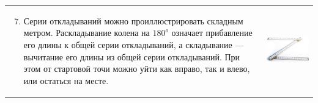 \begin{tabular}{ll}
\begin{minipage}{0.6\linewidth}
\begin{enumerate}\setcounter{enumi}{6}
\item Серии откладываний можно проиллюстрировать складным метром. Раскладывание колена на $180^o$ означает прибавление его длины к общей серии откладываний, а складывание --- вычитание его длины из общей серии откладываний. При этом от стартовой точи можно уйти как вправо, так и влево, или остаться на месте.
\end{enumerate}
\end{minipage}
&
\begin{minipage}{0.4\linewidth}
\includegraphics[scale=0.3]{meter.png}
\end{minipage}
\end{tabular}
